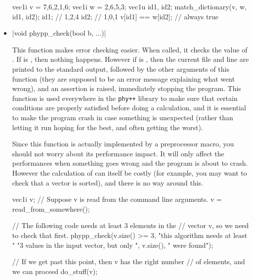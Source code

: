\documentclass[12pt]{report}
\newcommand{\phypp}{\texttt{phy++}\xspace}
\newenvironment{example}
{
    \begin{mdframed}[style=example,frametitle={Example}]
}
{
    \end{mdframed}
}
\begin{document}
\begin{itemize}
\begin{example}
\begin{cppcode}
vec1i v = {7,6,2,1,6};
vec1i w = {2,6,5,3};
vec1u id1, id2;
match_dictionary(v, w, id1, id2);
id1; // {1,2,4}
id2; // {1,0,1}
v[id1] == w[id2]; // always true
\end{cppcode}
\end{example}

\item \cppinline|void phypp_check(bool b, ...)| 

This function makes error checking easier. When called, it checks the value of . If  is , then nothing happens. However if  is , then the current file and line are printed to the standard output, followed by the other arguments of this function (they are supposed to be an error message explaining what went wrong), and an assertion is raised, immediately stopping the program. This function is used everywhere in the \phypp library to make sure that certain conditions are properly satisfied before doing a calculation, and it is essential to make the program crash in case something is unexpected (rather than letting it run hoping for the best, and often getting the worst).

Since this function is actually implemented by a preprocessor macro, you should not worry about its performance impact. It will only affect the performances when something goes wrong and the program is about to crash. However the calculation of  can itself be costly (for example, you may want to check that a vector is sorted), and there is no way around this.

\begin{example}
\begin{cppcode}
vec1i v;
// Suppose v is read from the command line arguments.
v = read_from_somewhere();

// The following code needs at least 3 elements in the
// vector v, so we need to check that first.
phypp_check(v.size() >= 3, "this algorithm needs at least "
    "3 values in the input vector, but only ", v.size(),
    " were found");

// If we get past this point, then v has the right number
// of elements, and we can proceed
do_stuff(v);
\end{cppcode}
\end{example}
\end{itemize}
\end{document}

